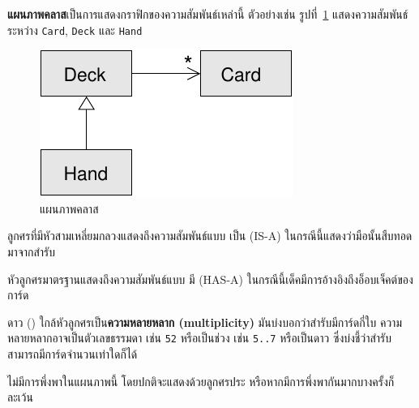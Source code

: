 
{\bf แผนภาพคลาส}เป็นการแสดงกราฟิกของความสัมพันธ์เหล่านี้ ตัวอย่างเช่น รูปที่~\ref{fig.class1} 
แสดงความสัมพันธ์ระหว่าง {\tt Card}, {\tt Deck} และ {\tt Hand}

\begin{figure}
\centerline
{\includegraphics[scale=0.8]{figs/class1.pdf}}
\caption{แผนภาพคลาส}
\label{fig.class1}
\end{figure}


ลูกศรที่มีหัวสามเหลี่ยมกลวงแสดงถึงความสัมพันธ์แบบ เป็น (IS-A) ในกรณีนี้แสดงว่ามือนั้นสืบทอดมาจากสำรับ


หัวลูกศรมาตรฐานแสดงถึงความสัมพันธ์แบบ มี (HAS-A) ในกรณีนี้เด็คมีการอ้างอิงถึงอ็อบเจ็คต์ของการ์ด


ดาว ({\tt *}) ใกล้หัวลูกศรเป็น{\bf ความหลายหลาก (multiplicity)} มันบ่งบอกว่าสำรับมีการ์ดกี่ใบ 
ความหลายหลากอาจเป็นตัวเลขธรรมดา เช่น {\tt 52} หรือเป็นช่วง เช่น {\tt 5..7} หรือเป็นดาว ซึ่งบ่งชี้ว่าสำรับสามารถมีการ์ดจำนวนเท่าใดก็ได้


ไม่มีการพึ่งพาในแผนภาพนี้ โดยปกติจะแสดงด้วยลูกศรประ หรือหากมีการพึ่งพากันมากบางครั้งก็ละเว้น 

